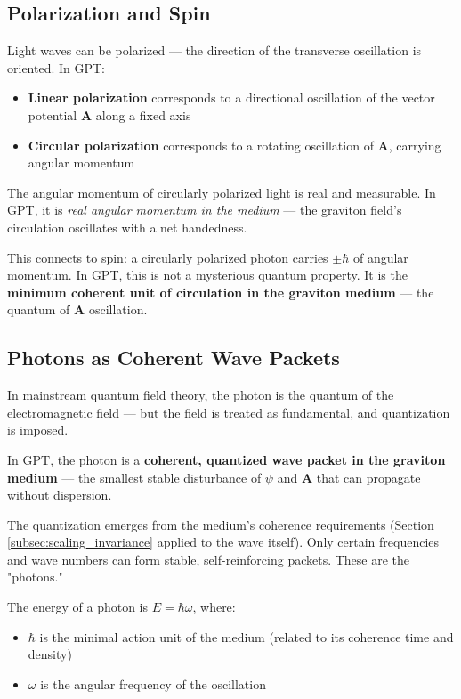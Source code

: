 \documentclass[12pt, a4paper]{article}
\begin{document}
\subsection{Polarization and Spin}
\label{subsec:polarization_spin}

Light waves can be polarized — the direction of the transverse oscillation is oriented. In GPT:

\begin{itemize}
    \item \textbf{Linear polarization} corresponds to a directional oscillation of the vector potential \( \mathbf{A} \) along a fixed axis
    \item \textbf{Circular polarization} corresponds to a rotating oscillation of \( \mathbf{A} \), carrying angular momentum
\end{itemize}

The angular momentum of circularly polarized light is real and measurable. In GPT, it is \textit{real angular momentum in the medium} — the graviton field's circulation oscillates with a net handedness.

This connects to spin: a circularly polarized photon carries \( \pm \hbar \) of angular momentum. In GPT, this is not a mysterious quantum property. It is the \textbf{minimum coherent unit of circulation in the graviton medium} — the quantum of \( \mathbf{A} \) oscillation.

\subsection{Photons as Coherent Wave Packets}
\label{subsec:photons}

In mainstream quantum field theory, the photon is the quantum of the electromagnetic field — but the field is treated as fundamental, and quantization is imposed.

In GPT, the photon is a \textbf{coherent, quantized wave packet in the graviton medium} — the smallest stable disturbance of \( \psi \) and \( \mathbf{A} \) that can propagate without dispersion.

The quantization emerges from the medium's coherence requirements (Section \ref{subsec:scaling_invariance} applied to the wave itself). Only certain frequencies and wave numbers can form stable, self-reinforcing packets. These are the "photons."

The energy of a photon is \( E = \hbar \omega \), where:
\begin{itemize}
    \item \( \hbar \) is the minimal action unit of the medium (related to its coherence time and density)
    \item \( \omega \) is the angular frequency of the oscillation
\end{itemize}
\end{document}
